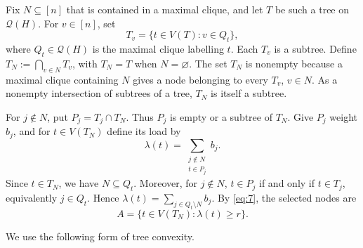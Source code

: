 \documentclass[11pt]{amsart}
\newtheorem{lemma}[theorem]{Lemma}
\theoremstyle{definition}
\newcommand{\cl}{\operatorname{cl}}
\newcommand{\conv}{\operatorname{conv}}
\newcommand{\cQ}{\mathcal Q}
\begin{document}
Fix $N\subseteq[n]$ that is contained in a maximal clique, and let $T$ be such a tree on $\cQ(H)$. For $v\in[n]$, set
\[
T_v=\{t\in V(T):v\in Q_t\},
\]
where $Q_t\in\cQ(H)$ is the maximal clique labelling $t$. Each $T_v$ is a subtree. Define $T_N:=\bigcap_{v\in N}T_v$, with $T_N=T$ when $N=\varnothing$. The set $T_N$ is nonempty because a maximal clique containing $N$ gives a node belonging to every $T_v$, $v\in N$. As a nonempty intersection of subtrees of a tree, $T_N$ is itself a subtree.

For $j\notin N$, put $P_j=T_j\cap T_N$. Thus $P_j$ is empty or a subtree of $T_N$. Give $P_j$ weight $b_j$, and for $t\in V(T_N)$ define its load by
\[
\lambda(t)=\sum_{\substack{j\notin N\\ t\in P_j}}b_j.
\]
Since $t\in T_N$, we have $N\subseteq Q_t$. Moreover, for $j\notin N$, $t\in P_j$ if and only if $t\in T_j$, equivalently $j\in Q_t$. Hence $\lambda(t)=\sum_{j\in Q_t\setminus N}b_j$. By \cref{eq:7}, the selected nodes are
\[
A=\{t\in V(T_N):\lambda(t)\ge r\}.
\]

We use the following form of tree convexity.

\end{document}
